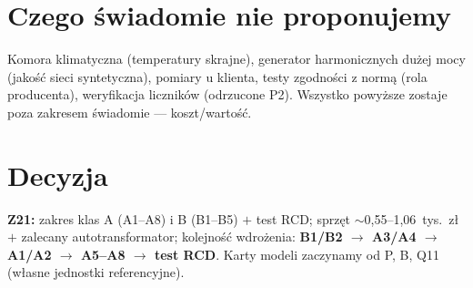 \documentclass[11pt,a4paper]{article}
\begin{document}
\section{Czego świadomie nie proponujemy}
Komora klimatyczna (temperatury skrajne), generator harmonicznych dużej mocy (jakość sieci
syntetyczna), pomiary u klienta, testy zgodności z normą (rola producenta), weryfikacja liczników
(odrzucone P2). Wszystko powyższe zostaje poza zakresem świadomie --- koszt/wartość.

\section{Decyzja}
\textbf{Z21:} zakres klas A (A1--A8) i B (B1--B5) $+$ test RCD; sprzęt $\sim$0,55--1,06~tys.~zł
$+$ zalecany autotransformator; kolejność wdrożenia: \textbf{B1/B2 $\to$ A3/A4 $\to$ A1/A2 $\to$
A5--A8 $\to$ test RCD}. Karty modeli zaczynamy od P, B, Q11 (własne jednostki referencyjne).
\end{document}
